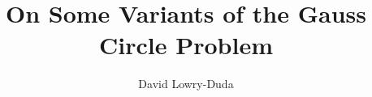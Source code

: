 \documentclass[12pt]{report}   %
\title{On Some Variants of the Gauss Circle Problem}
\author{David Lowry-Duda}
\theoremstyle{definition}
\begin{document}


\begin{preliminaries}
\maketitle

\copyrightpage


\begin{abstract}
  
  \thispagestyle{empty}
\end{abstract}


\begin{signature}
\end{signature}


\begin{vita}
  
\end{vita}


\begin{dedication}
  
\end{dedication}


\begin{acknowledgments}
  
\end{acknowledgments}


\begin{spacing}{1}
  \tableofcontents
  \clearpage{\pagestyle{empty}\cleardoublepage}

  \footnotesize
  \fontsize{11.5pt}{12.5pt}\selectfont

  \normalsize
\end{spacing}

\end{preliminaries}



\pagestyle{myheadings}




%
\end{document}
